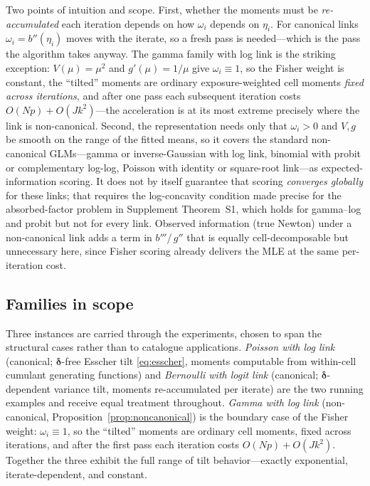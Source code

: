 \documentclass[11pt]{article}
\newcommand{\bdelta}{\bm{\delta}}
\begin{document}
Two points of intuition and scope.  First, whether the moments must be
\emph{re-accumulated} each iteration depends on how $\omega_i$ depends on
$\eta_i$.  For canonical links $\omega_i = b''(\eta_i)$ moves with the
iterate, so a fresh pass is needed---which is the pass the algorithm
takes anyway.  The gamma family with log link is the striking exception:
$V(\mu) = \mu^2$ and $g'(\mu) = 1/\mu$ give $\omega_i \equiv 1$, so the
Fisher weight is constant, the ``tilted'' moments are ordinary
exposure-weighted cell moments \emph{fixed across iterations}, and after
one pass each subsequent iteration costs $O(Np) + O(Jk^2)$---the
acceleration is at its most extreme precisely where the link is
non-canonical.  Second, the representation needs only that
$\omega_i > 0$ and $V, g$ be smooth on the range of the fitted means, so
it covers the standard non-canonical GLMs---gamma or inverse-Gaussian
with log link, binomial with probit or complementary log-log, Poisson
with identity or square-root link---as expected-information scoring.  It
does not by itself guarantee that scoring \emph{converges globally} for
these links; that requires the log-concavity condition made precise for
the absorbed-factor problem in Supplement Theorem~S1, which holds for
gamma--log and probit but not for every link.  Observed information
(true Newton) under a non-canonical link adds a term in
$b'''$/\,$g''$ that is equally cell-decomposable but unnecessary here,
since Fisher scoring already delivers the MLE at the same per-iteration
cost.


\subsection{Families in scope}\label{sec:families-main}

Three instances are carried through the experiments, chosen to span
the structural cases rather than to catalogue applications.
\emph{Poisson with log link} (canonical; $\bdelta$-free Esscher tilt
\eqref{eq:esscher}, moments computable from within-cell cumulant
generating functions) and \emph{Bernoulli with logit link} (canonical;
$\bdelta$-dependent variance tilt, moments re-accumulated per iterate)
are the two running examples and receive equal treatment throughout.
\emph{Gamma with log link} (non-canonical,
Proposition~\ref{prop:noncanonical}) is the boundary case of the Fisher
weight: $\omega_i \equiv 1$, so the ``tilted'' moments are ordinary
cell moments, fixed across iterations, and after the first pass each
iteration costs $O(Np) + O(Jk^2)$.  Together the three exhibit the full
range of tilt behavior---exactly exponential, iterate-dependent, and
constant.
\end{document}
